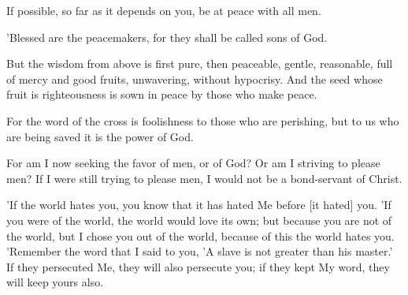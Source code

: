 \begin{scripture}[Romans 12:18]
    If possible, so far as it depends on you, be at peace with all men.
\end{scripture}

\vspace{2\baselineskip}

\begin{scripture}[Matthew 5:9]
    'Blessed are the peacemakers, for they shall be called sons of God.
\end{scripture}

\vspace{2\baselineskip}

\begin{scripture}[James 3:17-18]
    But the wisdom from above is first pure, then peaceable, gentle, reasonable, full of mercy and good fruits, unwavering, without hypocrisy.
    And the seed whose fruit is righteousness is sown in peace by those who make peace.
\end{scripture}

\vspace{2\baselineskip}

\begin{scripture}[1 Corinthians 1:18]
    For the word of the cross is foolishness to those who are perishing, but to us who are being saved it is the power of God.
\end{scripture}

\vspace{2\baselineskip}

\begin{scripture}[Galatians 1:10]
    For am I now seeking the favor of men, or of God? Or am I striving to please men? If I were still trying to please men, I would not be a bond-servant of Christ.
\end{scripture}

\vspace{2\baselineskip}

\begin{scripture}[John 15:18-20]
    'If the world hates you, you know that it has hated Me before [it hated] you.
    'If you were of the world, the world would love its own; but because you are not of the world, but I chose you out of the world, because of this the world hates you.
    'Remember the word that I said to you, 'A slave is not greater than his master.' If they persecuted Me, they will also persecute you; if they kept My word, they will keep yours also.
\end{scripture}

